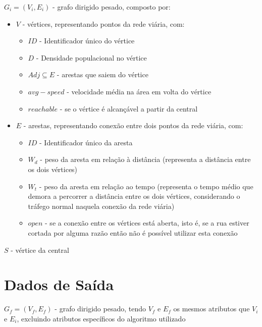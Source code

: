 \documentclass[article, a4paper, 12pt, oneside]{memoir}
\begin{document}
$G_i = (V_i, E_i)$ - grafo dirigido pesado, composto por:
\begin{itemize}
	\item $V$ - vértices, representando pontos da rede viária, com:
		\begin{itemize}
			\item $ID$ - Identificador único do vértice
			\item $D$ - Densidade populacional no vértice
			\item $Adj \subseteq E$ - arestas que saiem do vértice
			\item $avg-speed$ - velocidade média na área em volta do vértice
			\item $reachable$ - se o vértice é alcançável a partir da central
		\end{itemize}
	\item $E$ - arestas, representando conexão entre dois pontos da rede viária, com:
		\begin{itemize}
			\item $ID$ - Identificador único da aresta
			\item $W_d$ - peso da aresta em relação à distância (representa a distância entre os dois vértices)
			\item $W_t$ - peso da aresta em relação ao tempo (representa o tempo médio que demora a percorrer a distância entre os dois vértices, considerando o tráfego normal naquela conexão da rede viária)
			\item $open$ - se a conexão entre os vértices está aberta, isto é, se a rua estiver cortada por alguma razão então não é possível utilizar esta conexão
		\end{itemize}
\end{itemize}

$S$ - vértice da central

\section{Dados de Saída}

$G_f = (V_f, E_f)$ - grafo dirigido pesado, tendo $V_f$ e $E_f$ os mesmos atributos que $V_i$ e $E_i$, excluindo atributos específicos do algoritmo utilizado
\end{document}
